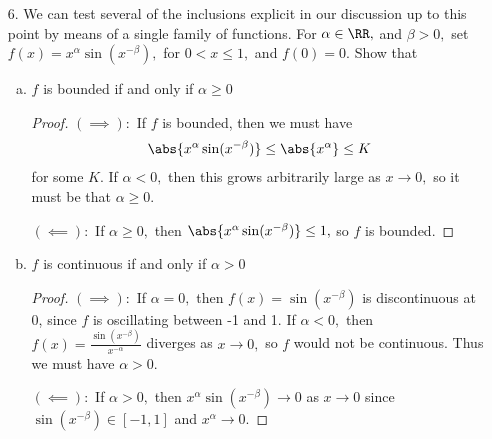 \documentclass{article}
\begin{document}
\begin{itemize}
\begin{itemize}
			\item[(v)] $V_a^b \abs{f} \le V_a^b f$
				\begin{proof}
					For $x, y\in\RR,$ it holds that $\abs{x}-\abs{y}\le x-y.$ Check by casework on the signs of $x, y.$

					Given a partition $P=\left\{ a=x_0<x_1<\cdots<x_n=b \right\},$ we have
					\begin{align*}
						V(\abs{f}, P) &= \sum_{i=1}^{n} \abs{\abs{f(x_i)}-\abs{f(x_{i-1})}} \le \sum_{i=1}^{n} \abs{f(x_i)-f(x_{i-1})} = V(f, P)
					\end{align*}
					so taking supremums of $P,$ the result follows.
				\end{proof}
				
		\end{itemize}

	\item[6.] We can test several of the inclusions explicit in our discussion up to this point by means of a single family of functions. For $\alpha\in\RR,$ and $\beta>0,$ set $f(x)=x^\alpha \sin(x^{-\beta}),$ for $0<x\le 1,$ and $f(0)=0.$ Show that
		\begin{enumerate}[(a)]
			\item $f$ is bounded if and only if $\alpha\ge 0$
				\begin{proof}
					$(\implies):$ If $f$ is bounded, then we must have
					\begin{align*}
						\abs{x^\alpha\sin(x^{-\beta})} \le \abs{x^\alpha} \le K
					\end{align*}
					for some $K.$ If $\alpha<0,$ then this grows arbitrarily large as $x\to0,$ so it must be that $\alpha\ge 0.$

					$(\impliedby):$ If $\alpha\ge 0,$ then $\abs{x^\alpha\sin(x^{-\beta})}\le 1,$ so $f$ is bounded.
				\end{proof}

			\item $f$ is continuous if and only if $\alpha>0$
				\begin{proof}
					$(\implies):$ If $\alpha=0,$ then $f(x)= \sin(x^{-\beta})$ is discontinuous at 0, since $f$ is oscillating between -1 and 1. If $\alpha<0,$ then $f(x)=\frac{\sin(x^{-\beta})}{x^{-\alpha}}$ diverges as $x\to 0,$ so $f$ would not be continuous. Thus we must have $\alpha>0.$

					$(\impliedby):$ If $\alpha>0,$ then $x^\alpha \sin(x^{-\beta})\to 0$ as $x\to 0$ since $\sin(x^{-\beta})\in[-1, 1]$ and $x^{\alpha}\to 0.$
				\end{proof}


\end{enumerate}
\end{itemize}
\end{document}

